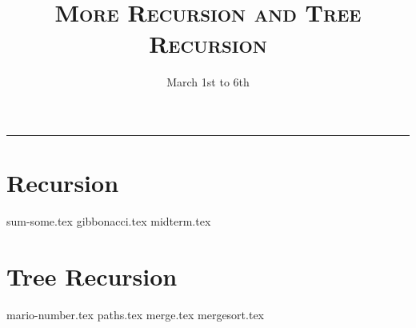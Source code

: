\documentclass{exam}
\title{\textsc{More Recursion and Tree Recursion}}
\date{March 1st to 6th}
\begin{document}
\maketitle
\rule{\textwidth}{0.15em}
\fontsize{12}{15}\selectfont


\section{Recursion}
\begin{questions}
{sum-some.tex}
{gibbonacci.tex}
{midterm.tex}
\end{questions}


\section{Tree Recursion}
\begin{questions}
{mario-number.tex}
\pagebreak
{paths.tex}
\pagebreak
{merge.tex}
{mergesort.tex}

\end{questions}
\end{document}
